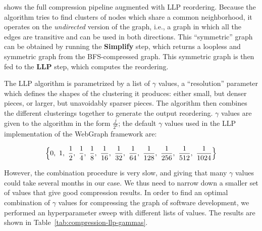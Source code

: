  shows the full compression pipeline
augmented with \gls{LLP} reordering. Because the algorithm tries to find
clusters of nodes which share a common neighborhood, it operates on the
\emph{undirected} version of the graph, i.e., a graph in which all the edges
are transitive and can be used in both directions. This ``symmetric'' graph can
be obtained by running the \textbf{Simplify} step, which returns a loopless and
symmetric graph from the \gls{BFS}-compressed graph. This symmetric graph is
then fed to the \textbf{LLP} step, which computes the reordering.

The \gls{LLP} algorithm is parametrized by a list of $\gamma$ values, a
``resolution'' parameter which defines the shapes of the clustering it
produces: either small, but denser pieces, or larger, but unavoidably sparser
pieces. The algorithm then combines the different clusterings together to
generate the output reordering. $\gamma$ values are given to the algorithm in
the form $\displaystyle \frac{j}{2^k}$; the default $\gamma$ values used in the
\gls{LLP} implementation of the WebGraph framework are:

\[
    \Bigl\{
    0,~1,~\frac{1}{2},~\frac{1}{4},~\frac{1}{8},~\frac{1}{16},~\frac{1}{32},~%
    \frac{1}{64},~\frac{1}{128},~\frac{1}{256},~\frac{1}{512},~\frac{1}{1024}
    \Bigr\}
\]

However, the combination procedure is very slow, and giving that many $\gamma$
values could take several months in our case. We thus need to narrow down a
smaller set of values that give good compression results.
In order to find an
optimal combination of $\gamma$ values for compressing the graph of software
development, we performed an hyperparameter sweep with different lists of
values. The results are shown in Table~\ref{tab:compression-llp-gammas}.

